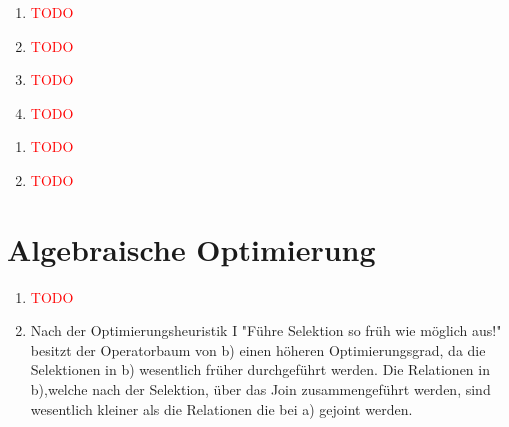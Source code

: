 \documentclass[ngerman]{gdb-aufgabenblatt}
\begin{document}
\begin{enumerate}
    \item 
        \begin{enumerate}
            \item 
                \textcolor{red}{TODO}
            \item 
                \textcolor{red}{TODO}
            \item 
                \textcolor{red}{TODO}
            
        \end{enumerate}
    \item 
        \begin{enumerate}
            \item 
                \textcolor{red}{TODO}
            \item
                \textcolor{red}{TODO}
            \item
                \textcolor{red}{TODO}
            \item
                \textcolor{red}{TODO}
                
        \end{enumerate}    

    \item 
        \begin{enumerate}
            \item 
                \textcolor{red}{TODO}
            \item
                 \textcolor{red}{TODO}
                
        \end{enumerate}    

\section{Algebraische Optimierung}

\begin{enumerate}
    \item
        \textcolor{red}{TODO}
    \item  
        Nach der Optimierungsheuristik I "Führe Selektion so früh wie möglich aus!" besitzt der Operatorbaum von b) einen höheren Optimierungsgrad, da die Selektionen in b) wesentlich früher durchgeführt werden.
        Die Relationen in b),welche nach der Selektion, über das Join zusammengeführt werden, sind wesentlich kleiner als die Relationen die bei a) gejoint werden.

\end{enumerate}
\end{document}

